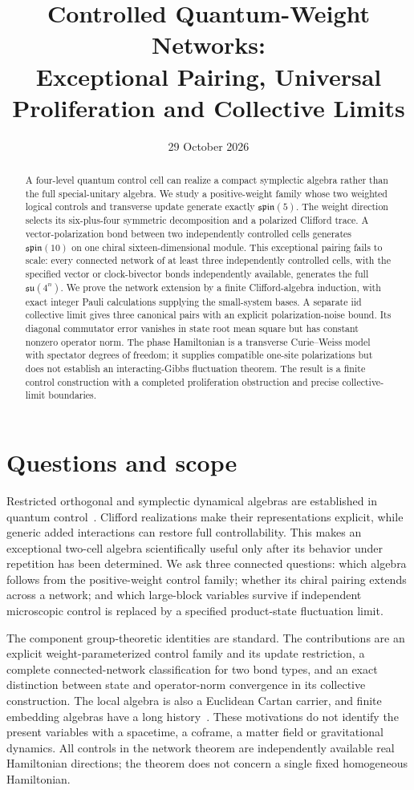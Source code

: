 \documentclass[11pt]{article}
\title{Controlled Quantum-Weight Networks:\\Exceptional Pairing, Universal Proliferation and Collective Limits}
\author{}
\date{29 October 2026}
\theoremstyle{remark}\newtheorem{remark}[theorem]{Remark}
\begin{document}
\maketitle
\begin{abstract}
A four-level quantum control cell can realize a compact symplectic algebra rather than the full special-unitary algebra.
We study a positive-weight family whose two weighted logical controls and transverse update generate exactly $\mathfrak{spin}(5)$.
The weight direction selects its six-plus-four symmetric decomposition and a polarized Clifford trace.
A vector-polarization bond between two independently controlled cells generates $\mathfrak{spin}(10)$ on one chiral sixteen-dimensional module.
This exceptional pairing fails to scale: every connected network of at least three independently controlled cells, with the specified vector or clock-bivector bonds independently available, generates the full $\mathfrak{su}(4^n)$.
We prove the network extension by a finite Clifford-algebra induction, with exact integer Pauli calculations supplying the small-system bases.
A separate iid collective limit gives three canonical pairs with an explicit polarization-noise bound.
Its diagonal commutator error vanishes in state root mean square but has constant nonzero operator norm.
The phase Hamiltonian is a transverse Curie--Weiss model with spectator degrees of freedom; it supplies compatible one-site polarizations but does not establish an interacting-Gibbs fluctuation theorem.
The result is a finite control construction with a completed proliferation obstruction and precise collective-limit boundaries.
\end{abstract}
\section{Questions and scope}
Restricted orthogonal and symplectic dynamical algebras are established in quantum control~\cite{Schirmer2002,DAles2008}.
Clifford realizations make their representations explicit, while generic added interactions can restore full controllability.
This makes an exceptional two-cell algebra scientifically useful only after its behavior under repetition has been determined.
We ask three connected questions: which algebra follows from the positive-weight control family; whether its chiral pairing extends across a network; and which large-block variables survive if independent microscopic control is replaced by a specified product-state fluctuation limit.

The component group-theoretic identities are standard.
The contributions are an explicit weight-parameterized control family and its update restriction, a complete connected-network classification for two bond types, and an exact distinction between state and operator-norm convergence in its collective construction.
The local algebra is also a Euclidean Cartan carrier, and finite embedding algebras have a long history~\cite{Snyder1947,Yang1947,Chandrasekharan1997}.
These motivations do not identify the present variables with a spacetime, a coframe, a matter field or gravitational dynamics.
All controls in the network theorem are independently available real Hamiltonian directions; the theorem does not concern a single fixed homogeneous Hamiltonian.
\end{document}
